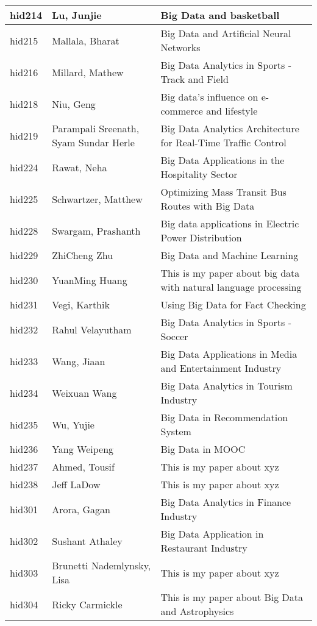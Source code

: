 \documentclass[12pt]{article}
\begin{document}
\begin{footnotesize}
\begin{longtable}{|p{1cm}p{5cm}p{9cm}|}
\hline
hid214 & Lu, Junjie & Big Data and basketball  \\
\hline
hid215 & Mallala, Bharat & Big Data and Artificial Neural Networks  \\
\hline
hid216 & Millard, Mathew & Big Data Analytics in Sports - Track and Field  \\
\hline
hid218 & Niu, Geng & Big data's influence on e-commerce and lifestyle  \\
\hline
hid219 & Parampali Sreenath, Syam Sundar Herle & Big Data Analytics Architecture for Real-Time Traffic Control  \\
\hline
hid224 & Rawat, Neha & Big Data Applications in the Hospitality Sector  \\
\hline
hid225 & Schwartzer, Matthew & Optimizing Mass Transit Bus Routes with Big Data  \\
\hline
hid228 & Swargam, Prashanth & Big data applications in Electric Power Distribution  \\
\hline
hid229 & ZhiCheng Zhu & Big Data and Machine Learning  \\
\hline
hid230 & YuanMing Huang & This is my paper about big data with natural language processing  \\
\hline
hid231 & Vegi, Karthik & Using Big Data for Fact Checking  \\
\hline
hid232 & Rahul Velayutham & Big Data Analytics in Sports - Soccer  \\
\hline
hid233 & Wang, Jiaan & Big Data Applications in Media and Entertainment Industry  \\
\hline
hid234 & Weixuan Wang & Big Data Analytics in Tourism Industry  \\
\hline
hid235 & Wu, Yujie & Big Data in Recommendation System  \\
\hline
hid236 & Yang Weipeng & Big Data in MOOC  \\
\hline
hid237 & Ahmed, Tousif & This is my paper about xyz  \\
\hline
hid238 & Jeff LaDow & This is my paper about xyz  \\
\hline
hid301 & Arora, Gagan & Big Data Analytics in Finance Industry  \\
\hline
hid302 & Sushant Athaley & Big Data Application in Restaurant Industry  \\
\hline
hid303 & Brunetti Nademlynsky, Lisa & This is my paper about xyz  \\
\hline
hid304 & Ricky Carmickle & This is my paper about Big Data and Astrophysics  \\

\end{longtable}
\end{footnotesize}
\end{document}
